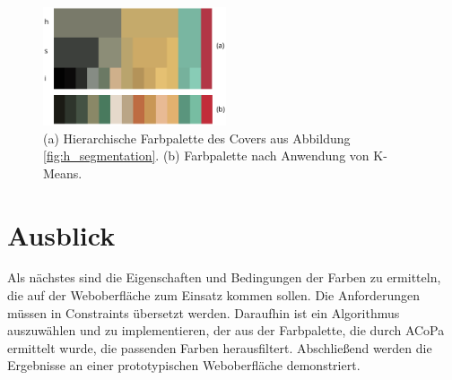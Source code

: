 \documentclass[11pt,a4paper,bibliography=totoc,twocolumn]{scrartcl}
\begin{document}
\begin{figure}[h]
\centering
\includegraphics[width=0.48\textwidth]{img/palette.png}
\caption{(a) Hierarchische Farbpalette des Covers aus Abbildung \ref{fig:h_segmentation}. (b) Farbpalette nach Anwendung von K-Means.}
\label{fig:palette}
\end{figure}

\section{Ausblick}

Als nächstes sind die Eigenschaften und Bedingungen der Farben zu ermitteln, die auf der Weboberfläche zum Einsatz kommen sollen. Die Anforderungen müssen in Constraints übersetzt werden. Daraufhin ist ein Algorithmus auszuwählen und zu implementieren, der aus der Farbpalette, die durch ACoPa ermittelt wurde, die passenden Farben herausfiltert. Abschließend werden die Ergebnisse an einer prototypischen Weboberfläche demonstriert.


\footnotesize{}
\end{document}
